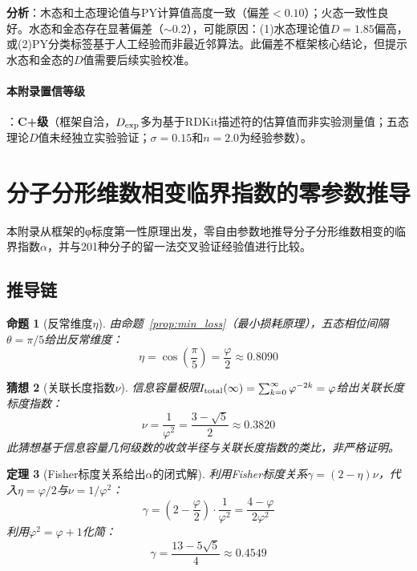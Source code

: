 \documentclass[12pt,a4paper,twocolumn]{article}
\renewcommand{\phi}{\varphi}
\newtheorem{theorem}{定理}[section]
\newtheorem{proposition}[theorem]{命题}
\newtheorem{conjecture}[theorem]{猜想}
\begin{document}
\textbf{分析}：木态和土态理论值与PY计算值高度一致（偏差$<0.10$）；火态一致性良好。水态和金态存在显著偏差（$\sim$0.2），可能原因：(1)水态理论值$D=1.85$偏高，或(2)PY分类标签基于人工经验而非最近邻算法。此偏差不框架核心结论，但提示水态和金态的$D$值需要后续实验校准。

\paragraph{本附录置信等级}：\textbf{C+级}（框架自洽，$D_{\rm exp}$多为基于RDKit描述符的估算值而非实验测量值；五态理论$D$值未经独立实验验证；$\sigma=0.15$和$n=2.0$为经验参数）。

\section{分子分形维数相变临界指数的零参数推导}
\label{app:critical_exponent}

本附录从框架的φ标度第一性原理出发，零自由参数地推导分子分形维数相变的临界指数$\alpha$，并与201种分子的留一法交叉验证经验值进行比较。

\subsection{推导链}
\label{subsec:alpha_derivation}

\begin{proposition}[反常维度$\eta$]
\label{prop:eta}
由命题~\ref{prop:min_loss}（最小损耗原理），五态相位间隔$\theta = \pi/5$给出反常维度：
\begin{equation}
\eta = \cos\left(\frac{\pi}{5}\right) = \frac{\phi}{2} \approx 0.8090
\end{equation}
\end{proposition}

\begin{conjecture}[关联长度指数$\nu$]
\label{conj:nu}
信息容量极限$I_{\rm total}(\infty) = \sum_{k=0}^{\infty}\phi^{-2k} = \phi$给出关联长度标度指数：
\begin{equation}
\nu = \frac{1}{\phi^2} = \frac{3-\sqrt{5}}{2} \approx 0.3820
\end{equation}
此猜想基于信息容量几何级数的收敛半径与关联长度指数的类比，非严格证明。
\end{conjecture}

\begin{theorem}[Fisher标度关系给出$\alpha$的闭式解]
\label{thm:alpha}
利用Fisher标度关系$\gamma = (2-\eta)\nu$，代入$\eta = \phi/2$与$\nu = 1/\phi^2$：
\begin{equation}
\gamma = \left(2 - \frac{\phi}{2}\right) \cdot \frac{1}{\phi^2} = \frac{4 - \phi}{2\phi^2}
\end{equation}
利用$\phi^2 = \phi + 1$化简：
\begin{equation}
\boxed{\gamma = \frac{13 - 5\sqrt{5}}{4} \approx 0.4549}
\end{equation}
\end{theorem}
\end{document}
